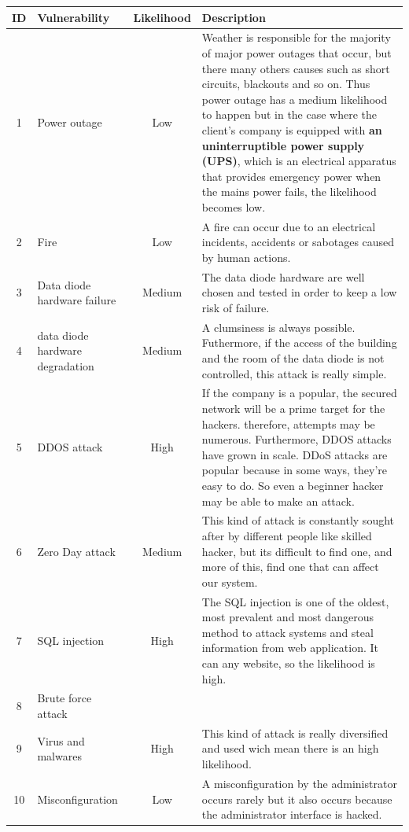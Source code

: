 \documentclass[a4paper,10pt]{article}
\begin{document}
\begin{longtable}{|c|p{}|c|p{10cm}|}
\hline
\textbf{ID}& \textbf{Vulnerability} & \textbf{Likelihood} & \textbf{Description}                 \\
\hline
1 & Power outage & Low & Weather is responsible for the majority of major power outages that occur, but there many others causes such as short circuits, blackouts and so on. Thus power outage has a medium likelihood to happen but in the case where the client's company is equipped with \textbf{an uninterruptible power supply (UPS)}, which is an electrical apparatus that provides emergency power when the mains power fails, the likelihood becomes low.    \\
\hline
2 & Fire & Low  &  A fire can occur due to an electrical incidents, accidents or sabotages caused by human actions.\\
\hline
3 & Data diode hardware failure  & Medium & The data diode hardware are well chosen and tested in order to keep a low risk of failure.\\ 
\hline
4 & data diode hardware degradation & Medium & A clumsiness is always possible. Futhermore, if the access of the building and the room of the data diode is not controlled, this attack is really simple. \\
\hline
5 & DDOS attack & High & If the company is a popular, the secured network will be a prime target for the hackers. therefore, attempts may be numerous. Furthermore, DDOS attacks have grown in scale. DDoS attacks are popular because in some ways, they're easy to do. So even a beginner hacker may be able to make an attack.\\
\hline
6 & Zero Day attack & Medium & This kind of attack is constantly sought after by different people like skilled hacker, but its difficult to find one, and more of this, find one that can affect our system. \\
\hline
7 &  SQL injection & High & The SQL injection is one of the oldest, most prevalent and most dangerous method to attack systems and steal information from web application. It can any website, so the likelihood is high.\\
\hline
8 & Brute force attack &  & \\
\hline
9 & Virus and malwares & High & This kind of attack is really diversified and used wich mean there is an high likelihood. \\
\hline
10 & Misconfiguration & Low & A misconfiguration by the administrator occurs rarely but it also occurs because the administrator interface is hacked.\\

\end{longtable}
\end{document}
